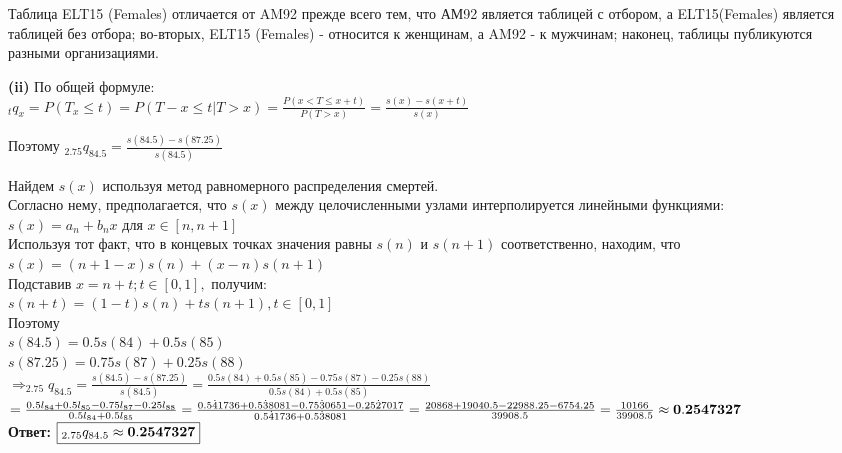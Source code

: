 \documentclass{article}
\begin{document}
Таблица  ELT15 (Females) отличается от AM92 прежде всего тем, что АМ92 является таблицей с отбором, а ELT15(Females) является таблицей без отбора; 
во-вторых, ELT15 (Females) - относится к женщинам, а AM92 - к мужчинам; наконец, таблицы публикуются разными организациями.

{\bf \large  (ii)}  По общей формуле:\\
$ _{t}q_x = P(T_x \leq t) = P(T-x \leq t | T>x ) = \frac { P(x < T \leq x+t) } { P(T > x) }  = \frac { s(x) - s(x+t)} { s(x)} $

Поэтому $ _{2.75}q_{84.5 } =   \frac { s(84.5) - s(87.25)} { s(84.5)} $

Найдем $s(x)$ используя метод равномерного распределения смертей.\\
Согласно нему, предполагается, что  $s(x)$ между целочисленными узлами интерполируется линейными функциями:\\

$s(x) = a_n + b_nx$ для $x \in [n,n+1]$\\
Используя тот факт, что в концевых точках значения равны $s(n)$ и $ s(n+1)$ соответственно, находим, что \\

$s(x) = (n+1-x)s(n) + (x-n)s(n+1)$\\

Подставив $x=n+t; t \in [0,1],$ получим:\\

$ s(n+t) =  (1-t)s(n) + ts(n+1),   t \in [0,1] $ \\

Поэтому\\
 $s(84.5) = 0.5s(84) + 0.5s(85)$\\
  $s(87.25) = 0.75s(87) + 0.25s(88)$\\
 
 
$ \Rightarrow  _{2.75}q_{84.5 } =   \frac { s(84.5) - s(87.25)} { s(84.5)}  = \frac {   0.5s(84) + 0.5s(85) -  0.75s(87) - 0.25s(88)   } {    0.5s(84) + 0.5s(85)  }$  \\

$=  \frac {   0.5l_{84} + 0.5l_{85}-  0.75l_{87}- 0.25l_{88}  } {    0.5l_{84} + 0.5l_{85} }  =  
 \frac {   0.5 \dot 41736 + 0.5 \dot 38081-  0.75 \dot 30651- 0.25 \dot 27017  } {   0.5 \dot 41736 + 0.5 \dot 38081}  
  =   \frac {   20868 + 19040.5 -  22988.25 - 6754.25  } {  39908.5}  = \frac { 10166}{ 39908.5} \approx  \bf 0.2547327$\\
 {\bf \large  Ответ:} $\boxed { _{2.75}q_{84.5 } \approx \bf 0.2547327}$\\
\end{document}
